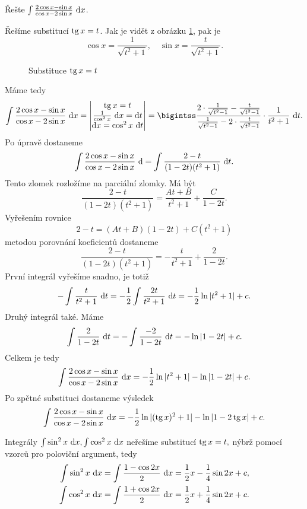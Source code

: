 \begin{priklad}
Řešte $\int \frac{2\cos x - \sin x}{\cos x - 2\sin x}\, \mathop{}\!\mathrm{d} x$.
\end{priklad}

\begin{reseni}
Řešíme substitucí $\operatorname{tg} x = t$. Jak je vidět z obrázku \ref{subs x}, pak je
$$
    \cos x = \frac{1}{\sqrt{t^2 + 1}}, \quad \sin x = \frac{t }{\sqrt{t^2 + 1}}.
$$
\begin{figure}[h]
	\centering
	\caption{Substituce $\operatorname{tg} x = t$}
	\label{subs x}
\end{figure}
Máme tedy
$$
    \int \frac{2\cos x - \sin x}{\cos x - 2\sin x}\, \d x = \begin{vmatrix}
	\tg x = t \\
	\frac{1}{\cos^2 x} \, \d x = \d t \\
	\d x = \cos ^2 x \, \d t
    \end{vmatrix} = \bigintss \frac{2 \cdot \frac{1}{\sqrt{t^2 -1}} - \frac{t }{\sqrt{t^2 -1}}}{\frac{1}{\sqrt{t^2 -1}}-2 \cdot \frac{t }{\sqrt{t^2 -1}}}\cdot \frac{1}{t^2 + 1}  \, \d t .
$$
Po úpravě dostaneme
$$
    \int \frac{2\cos x - \sin x}{\cos x - 2\sin x}\, \mathop{}\!\mathrm{d}  = \int \frac{2-t}{(1-2t)(t^2+1)} \, \mathop{}\!\mathrm{d} t.
$$
Tento zlomek rozložíme na parciální zlomky. Má být
$$
    \frac{2-t}{(1-2t)(t^2+1)} = \frac{At + B }{t^2 + 1} + \frac{C }{1-2t}.
$$
Vyřešením rovnice
$$
    2-t = (At + B)(1-2t) + C(t^2 + 1)
$$
metodou porovnání koeficientů dostaneme
$$
    \frac{2-t}{(1-2t)(t^2+1)} = -\frac{t }{t^2 + 1} + \frac{2 }{1-2t}.
$$
První integrál vyřešíme snadno, je totiž
$$
    -\int \frac{t }{t^2 + 1}\, \mathop{}\!\mathrm{d} t = - \frac{1}{2}\int \frac{2t }{t^2 + 1}\, \mathop{}\!\mathrm{d} t = -\frac{1}{2} \operatorname{ln}|t^2 + 1| + c .
$$
Druhý integrál také. Máme
$$
    \int \frac{2 }{1-2t}\, \mathop{}\!\mathrm{d} t = -\int \frac{-2 }{1-2t}\, \mathop{}\!\mathrm{d} t = -\operatorname{ln} |1-2t|+ c.
$$
Celkem je tedy
$$
    \int \frac{2\cos x - \sin x}{\cos x - 2\sin x}\, \mathop{}\!\mathrm{d} x = -\frac{1}{2} \operatorname{ln}|t^2 + 1| -\operatorname{ln} |1-2t|+ c.
$$
Po zpětné substituci dostaneme výsledek
$$
\int \frac{2\cos x - \sin x}{\cos x - 2\sin x}\, \mathop{}\!\mathrm{d} x = -\frac{1}{2} \operatorname{ln}|(\operatorname{tg} x)^2 + 1| -\operatorname{ln} |1-2\operatorname{tg} x|+ c.
$$
\end{reseni}

\begin{pozn}
    Integrály $\int \sin^2 x \, \mathop{}\!\mathrm{d} x, \int \cos^2 x \, \mathop{}\!\mathrm{d} x$ neřešíme substitucí
    $\operatorname{tg} x  = t,$ nýbrž pomocí vzorců pro poloviční argument, tedy
    \begin{align*}
        \int \sin^2 x \, \mathop{}\!\mathrm{d} x &= \int \frac{1-\cos 2x}{2}\, \mathop{}\!\mathrm{d} x = \frac{1}{2}x - \frac{1}{4} \sin 2x + c, \\
        \int \cos^2 x \, \mathop{}\!\mathrm{d} x &= \int \frac{1+\cos 2x}{2}\, \mathop{}\!\mathrm{d} x = \frac{1}{2}x + \frac{1}{4} \sin 2x + c.
    \end{align*}
\end{pozn}

